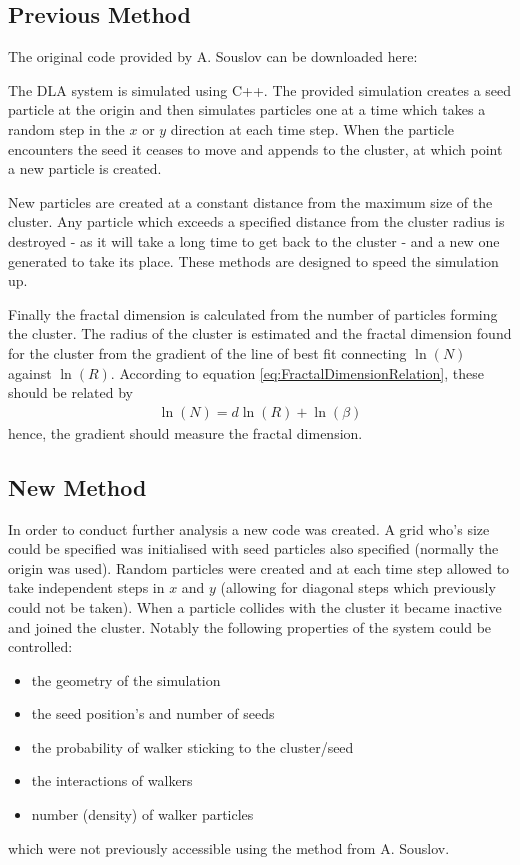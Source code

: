 \documentclass[%
 reprint,
 amsmath,amssymb,
 aps,
]{revtex4-2}
\begin{document}
\subsection{Previous Method}
The original code provided by A. Souslov can be downloaded here:

The DLA system is simulated using C++. The provided simulation creates a seed particle at the origin and then simulates particles one at a time which takes a random step in the $x$ or $y$ direction at each time step. When the particle encounters the seed it ceases to move and appends to the cluster, at which point a new particle is created.

New particles are created at a constant distance from the maximum size of the cluster. Any particle which exceeds a specified distance from the cluster radius is destroyed - as it will take a long time to get back to the cluster - and a new one generated to take its place. These methods are designed to speed the simulation up.

Finally the fractal dimension is calculated from the number of particles forming the cluster. The radius of the cluster is estimated and the fractal dimension found for the cluster from the gradient of the line of best fit connecting $\ln(N)$ against $\ln(R)$. According to equation \ref{eq:FractalDimensionRelation}, these should be related by
\begin{align}
\ln(N)=d \ln(R) + \ln(\beta)
\end{align} 
hence, the gradient should measure the fractal dimension.
\subsection{New Method}
In order to conduct further analysis a new code was created. A grid who's size could be specified was initialised with seed particles also specified (normally the origin was used). Random particles were created and at each time step allowed to take independent steps in $x$ and $y$ (allowing for diagonal steps which previously could not be taken). When a particle collides with the cluster it became inactive and joined the cluster. Notably the following properties of the system could be controlled:
\begin{itemize}
    \item the geometry of the simulation
    \item the seed position's and number of seeds
    \item the probability of walker sticking to the cluster/seed
    \item the interactions of walkers
    \item number (density) of walker particles
\end{itemize}
which were not previously accessible using the method from A. Souslov.


\nocite{*}

\end{document}
